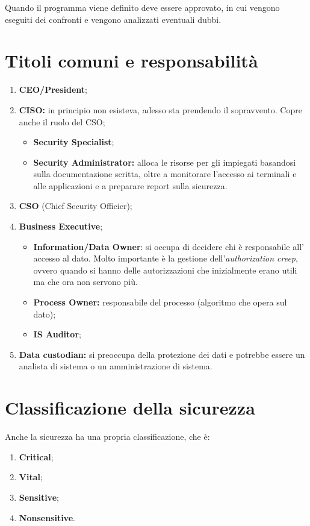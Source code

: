 Quando il programma viene definito deve essere approvato, in cui vengono
eseguiti dei confronti e vengono analizzati eventuali dubbi.

\section{Titoli comuni e responsabilità}

\begin{enumerate}
  \item \textbf{CEO/President};
  \item \textbf{CISO:} in principio non esisteva, adesso sta prendendo il sopravvento.
Copre anche il ruolo del CSO;
  \begin{itemize}
        \item \textbf{Security Specialist};
        \item \textbf{Security Administrator:} alloca le risorse per gli impiegati 
        basandosi sulla documentazione scritta, oltre a monitorare l'accesso 
        ai terminali e alle applicazioni e a preparare report sulla sicurezza.
  \end{itemize}
  \item \textbf{CSO} (Chief Security Officier);
  \item \textbf{Business Executive};
  \begin{itemize}
  \item \textbf{Information/Data Owner}: si occupa di decidere chi è responsabile all'
  accesso al dato. Molto importante è la gestione dell'\textit{authorization 
  creep}, ovvero quando si hanno delle autorizzazioni che inizialmente erano 
  utili ma che ora non servono più.
  \item \textbf{Process Owner:} responsabile del processo (algoritmo che opera sul dato);
  \item \textbf{IS Auditor};
  \end{itemize}
  \item \textbf{Data custodian:} si preoccupa della protezione dei dati e potrebbe essere un analista di
  sistema o un amministrazione di sistema.
\end{enumerate}

\section{Classificazione della sicurezza}

Anche la sicurezza ha una propria classificazione, che è:
\begin{enumerate}
  \item \textbf{Critical};
  \item \textbf{Vital};
  \item \textbf{Sensitive};
  \item \textbf{Nonsensitive}.
\end{enumerate}

